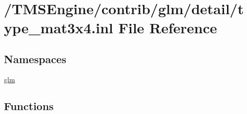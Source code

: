 \hypertarget{type__mat3x4_8inl}{}\section{/\+T\+M\+S\+Engine/contrib/glm/detail/type\+\_\+mat3x4.inl File Reference}
\label{type__mat3x4_8inl}
\subsection*{Namespaces}
\begin{DoxyCompactItemize}
\item 
 \hyperlink{namespaceglm}{glm}
\end{DoxyCompactItemize}
\subsection*{Functions}
